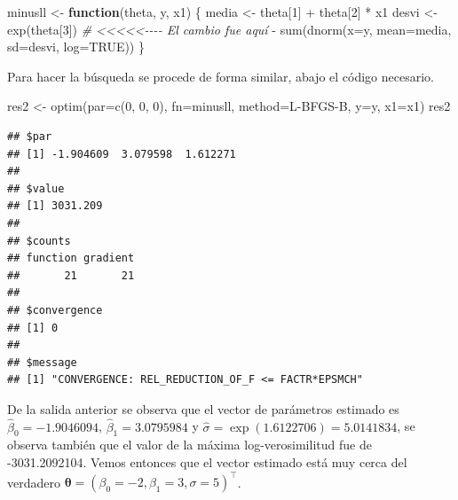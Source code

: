 \documentclass[
]{book}
\makeatletter
\newenvironment{Shaded}{\begin{snugshade}}{\end{snugshade}}
\newcommand{\AttributeTok}[1]{\textcolor[rgb]{0.77,0.63,0.00}{#1}}
\newcommand{\CommentTok}[1]{\textcolor[rgb]{0.56,0.35,0.01}{\textit{#1}}}
\newcommand{\ConstantTok}[1]{\textcolor[rgb]{0.00,0.00,0.00}{#1}}
\newcommand{\ControlFlowTok}[1]{\textcolor[rgb]{0.13,0.29,0.53}{\textbf{#1}}}
\newcommand{\DecValTok}[1]{\textcolor[rgb]{0.00,0.00,0.81}{#1}}
\newcommand{\FunctionTok}[1]{\textcolor[rgb]{0.00,0.00,0.00}{#1}}
\newcommand{\NormalTok}[1]{#1}
\newcommand{\OtherTok}[1]{\textcolor[rgb]{0.56,0.35,0.01}{#1}}
\newcommand{\SpecialCharTok}[1]{\textcolor[rgb]{0.00,0.00,0.00}{#1}}
\newcommand{\StringTok}[1]{\textcolor[rgb]{0.31,0.60,0.02}{#1}}
\newenvironment{kframe}{%
\medskip{}
\setlength{\fboxsep}{.8em}
 \def\at@end@of@kframe{}%
 \ifinner\ifhmode%
  \def\at@end@of@kframe{\end{minipage}}%
  \begin{minipage}{\columnwidth}%
 \fi\fi%
 \def\FrameCommand##1{\hskip\@totalleftmargin \hskip-\fboxsep
 \colorbox{shadecolor}{##1}\hskip-\fboxsep
     \hskip-\linewidth \hskip-\@totalleftmargin \hskip\columnwidth}%
 \MakeFramed {\advance\hsize-\width
   \@totalleftmargin\z@ \linewidth\hsize
   \@setminipage}}%
 {\par\unskip\endMakeFramed%
 \at@end@of@kframe}
\renewenvironment{Shaded}{\begin{kframe}}{\end{kframe}}
\makeatother
\begin{document}
\begin{Shaded}
\begin{Highlighting}[]
\NormalTok{minusll }\OtherTok{\textless{}{-}} \ControlFlowTok{function}\NormalTok{(theta, y, x1) \{}
\NormalTok{  media }\OtherTok{\textless{}{-}}\NormalTok{ theta[}\DecValTok{1}\NormalTok{] }\SpecialCharTok{+}\NormalTok{ theta[}\DecValTok{2}\NormalTok{] }\SpecialCharTok{*}\NormalTok{ x1  }
\NormalTok{  desvi }\OtherTok{\textless{}{-}} \FunctionTok{exp}\NormalTok{(theta[}\DecValTok{3}\NormalTok{])  }\CommentTok{\# \textless{}\textless{}\textless{}\textless{}\textless{}{-}{-}{-}{-} El cambio fue aquí}
  \SpecialCharTok{{-}} \FunctionTok{sum}\NormalTok{(}\FunctionTok{dnorm}\NormalTok{(}\AttributeTok{x=}\NormalTok{y, }\AttributeTok{mean=}\NormalTok{media, }\AttributeTok{sd=}\NormalTok{desvi, }\AttributeTok{log=}\ConstantTok{TRUE}\NormalTok{))}
\NormalTok{\}}
\end{Highlighting}
\end{Shaded}

Para hacer la búsqueda se procede de forma similar, abajo el código necesario.

\begin{Shaded}
\begin{Highlighting}[]
\NormalTok{res2 }\OtherTok{\textless{}{-}} \FunctionTok{optim}\NormalTok{(}\AttributeTok{par=}\FunctionTok{c}\NormalTok{(}\DecValTok{0}\NormalTok{, }\DecValTok{0}\NormalTok{, }\DecValTok{0}\NormalTok{), }\AttributeTok{fn=}\NormalTok{minusll, }\AttributeTok{method=}\StringTok{\textquotesingle{}L{-}BFGS{-}B\textquotesingle{}}\NormalTok{,}
              \AttributeTok{y=}\NormalTok{y, }\AttributeTok{x1=}\NormalTok{x1)}
\NormalTok{res2}
\end{Highlighting}
\end{Shaded}

\begin{verbatim}
## $par
## [1] -1.904609  3.079598  1.612271
## 
## $value
## [1] 3031.209
## 
## $counts
## function gradient 
##       21       21 
## 
## $convergence
## [1] 0
## 
## $message
## [1] "CONVERGENCE: REL_REDUCTION_OF_F <= FACTR*EPSMCH"
\end{verbatim}

De la salida anterior se observa que el vector de parámetros estimado es \(\hat{\beta}_0 = -1.9046094\), \(\hat{\beta}_1 = 3.0795984\) y \(\hat{\sigma} = \exp(1.6122706)=5.0141834\), se observa también que el valor de la máxima log-verosimilitud fue de -3031.2092104. Vemos entonces que el vector estimado está muy cerca del verdadero \(\boldsymbol{\theta}=(\beta_0=-2, \beta_1=3, \sigma=5)^\top\).
\end{document}
